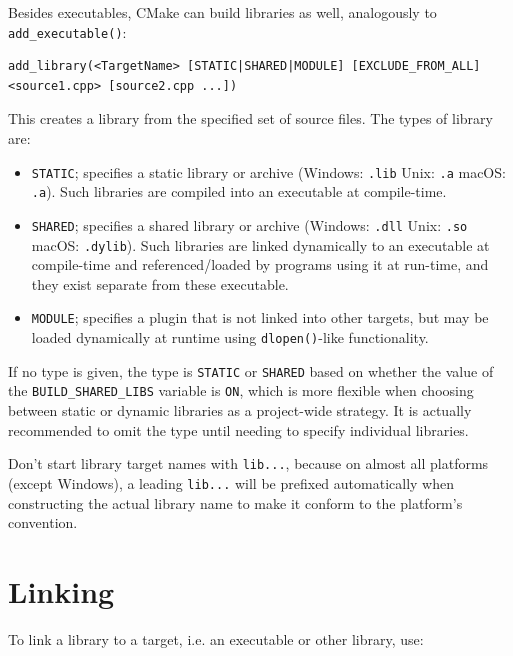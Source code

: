 \documentclass[table, xcdraw]{article}%
\begin{document}
Besides executables, CMake can build libraries as well, analogously to \texttt{add_executable()}:

\begin{verbatim}
add_library(<TargetName> [STATIC|SHARED|MODULE] [EXCLUDE_FROM_ALL] <source1.cpp> [source2.cpp ...])
\end{verbatim}

This creates a library from the specified set of source files. The types of library are:

\begin{itemize}
    \item \texttt{STATIC}; specifies a static library or archive (Windows: \texttt{.lib} Unix: \texttt{.a} macOS: \texttt{.a}). Such libraries are compiled into an executable at compile-time.
    \item \texttt{SHARED}; specifies a shared library or archive (Windows: \texttt{.dll} Unix: \texttt{.so} macOS: \texttt{.dylib}). Such libraries are linked dynamically to an executable at compile-time and referenced/loaded by programs using it at run-time, and they exist separate from these executable.
    \item \texttt{MODULE}; specifies a plugin that is not linked into other targets, but may be loaded dynamically at runtime using \texttt{dlopen()}-like functionality.
\end{itemize}

If no type is given, the type is \texttt{STATIC} or \texttt{SHARED} based on whether the value of the \texttt{BUILD_SHARED_LIBS} variable is \texttt{ON}, which is more flexible when choosing between static or dynamic libraries as a project-wide strategy. It is actually recommended to omit the type until needing to specify individual libraries.

Don't start library target names with \texttt{lib...}, because on almost all
platforms (except Windows), a leading \texttt{lib...} will be prefixed automatically when constructing the actual library name to make it conform to the platform's convention.

\section{Linking}

To link a library to a target, i.e. an executable or other library, use:
\end{document}
